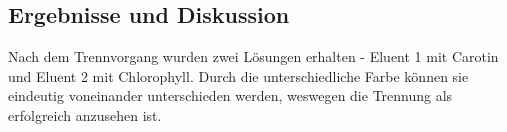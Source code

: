 \documentclass{article}
\begin{document}
    \subsection{Ergebnisse und Diskussion}
    
      Nach dem Trennvorgang wurden zwei Lösungen erhalten - Eluent 1 mit Carotin und Eluent 2 mit Chlorophyll. Durch die unterschiedliche Farbe können sie eindeutig voneinander unterschieden werden, weswegen die Trennung als erfolgreich anzusehen ist.
      
  \pagebreak
  
  \listofreactions
  \printbibliography[title=Literaturverzeichnis]
  \listoffigures
  \listoftables
  
\end{document}
